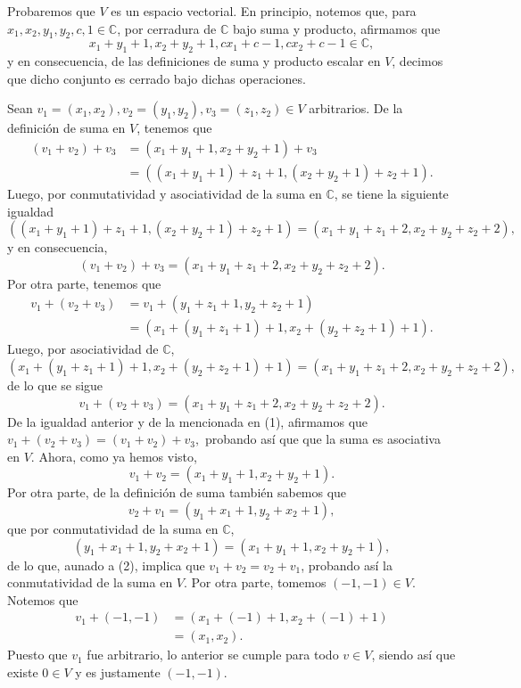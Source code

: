 \documentclass[11pt]{scrartcl}
\begin{document}
\begin{Sol}
    Probaremos que $V$ es un espacio vectorial. En principio, notemos que, para $x_1,x_2,y_1,y_2,c,1 \in \mathbb{C}$,
    por cerradura de $\mathbb{C}$ bajo suma y producto, afirmamos que
    \[
    x_1+y_1+1, x_2+y_2+1, cx_1+c-1,cx_2+c-1 \in \mathbb{C},
    \]
    y en consecuencia, de las definiciones de suma y producto escalar en $V$, decimos que dicho conjunto es cerrado
    bajo dichas operaciones.

    Sean $v_1=(x_1,x_2),v_2=(y_1,y_2), v_3=(z_1,z_2) \in V$ arbitrarios.
    De la definición de suma en $V$, tenemos que
    \begin{align*}
        (v_1+v_2)+v_3&=(x_1+y_1+1,x_2+y_2+1)+v_3 \\
        &=((x_1+y_1+1)+z_1+1,(x_2+y_2+1)+z_2+1).
    \end{align*}
    Luego, por conmutatividad y asociatividad de la suma en $\mathbb{C}$, se tiene la siguiente igualdad
    \[
    ((x_1+y_1+1)+z_1+1,(x_2+y_2+1)+z_2+1)=(x_1+y_1+z_1+2,x_2+y_2+z_2+2),
    \]
    y en consecuencia,
    \[
    (v_1+v_2)+v_3=(x_1+y_1+z_1+2,x_2+y_2+z_2+2). \tag{1}
    \]
    Por otra parte, tenemos que
    \begin{align*}
        v_1+(v_2+v_3)&=v_1+(y_1+z_1+1,y_2+z_2+1) \\
        &=(x_1+(y_1+z_1+1)+1,x_2+(y_2+z_2+1)+1).
    \end{align*}
    Luego, por asociatividad de $\mathbb{C}$,
    \[
    (x_1+(y_1+z_1+1)+1,x_2+(y_2+z_2+1)+1)=(x_1+y_1+z_1+2,x_2+y_2+z_2+2),
    \]
    de lo que se sigue
    \[
    v_1+(v_2+v_3)=(x_1+y_1+z_1+2,x_2+y_2+z_2+2).
    \]
    De la igualdad anterior y de la mencionada en (1), afirmamos que $v_1+(v_2+v_3)=(v_1+v_2)+v_3,$ probando así que
    que la suma es asociativa en $V$. Ahora, como ya hemos visto,
    \[
    v_1+v_2=(x_1+y_1+1,x_2+y_2+1). \tag{2}
    \]
    Por otra parte, de la definición de suma también sabemos que
    \[
    v_2+v_1=(y_1+x_1+1,y_2+x_2+1),
    \]
    que por conmutatividad de la suma en $\mathbb{C}$, 
    \[
    (y_1+x_1+1,y_2+x_2+1)=(x_1+y_1+1,x_2+y_2+1),
    \]
    de lo que, aunado a (2), implica que $v_1+v_2=v_2+v_1$, probando así la conmutatividad de la suma en $V$. Por otra parte,
    tomemos $(-1,-1) \in V$. Notemos que
    \begin{align*}
        v_1+(-1,-1)&=(x_1+(-1)+1,x_2+(-1)+1) \\
        &=(x_1,x_2).
    \end{align*}
    Puesto que $v_1$ fue arbitrario, lo anterior se cumple para todo $v \in V$, siendo así que existe $0 \in V$ y es justamente $(-1,-1)$.

\end{Sol}
\end{document}
